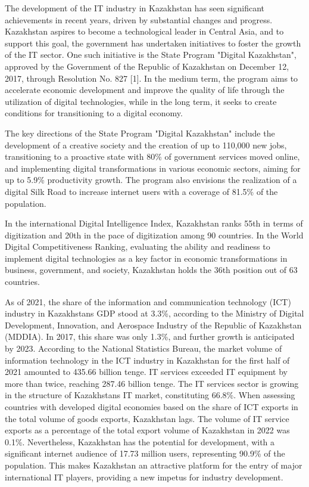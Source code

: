 The development of the IT industry in Kazakhstan has seen significant
achievements in recent years, driven by substantial changes and
progress. Kazakhstan aspires to become a technological leader in Central
Asia, and to support this goal, the government has undertaken
initiatives to foster the growth of the IT sector. One such initiative
is the State Program "Digital Kazakhstan", approved by the Government of
the Republic of Kazakhstan on December 12, 2017, through Resolution No.
827 {[}1{]}. In the medium term, the program aims to accelerate economic
development and improve the quality of life through the utilization of
digital technologies, while in the long term, it seeks to create
conditions for transitioning to a digital economy.

The key directions of the State Program "Digital Kazakhstan" include the
development of a creative society and the creation of up to 110,000 new
jobs, transitioning to a proactive state with 80\% of government
services moved online, and implementing digital transformations in
various economic sectors, aiming for up to 5.9\% productivity growth.
The program also envisions the realization of a digital Silk Road to
increase internet users with a coverage of 81.5\% of the population.

In the international Digital Intelligence Index, Kazakhstan ranks 55th
in terms of digitization and 20th in the pace of digitization among 90
countries. In the World Digital Competitiveness Ranking, evaluating the
ability and readiness to implement digital technologies as a key factor
in economic transformations in business, government, and society,
Kazakhstan holds the 36th position out of 63 countries.

As of 2021, the share of the information and communication technology
(ICT) industry in Kazakhstan\textquotesingle s GDP stood at 3.3\%,
according to the Ministry of Digital Development, Innovation, and
Aerospace Industry of the Republic of Kazakhstan (MDDIA). In 2017, this
share was only 1.3\%, and further growth is anticipated by 2023.
According to the National Statistics Bureau, the market volume of
information technology in the ICT industry in Kazakhstan for the first
half of 2021 amounted to 435.66 billion tenge. IT services exceeded IT
equipment by more than twice, reaching 287.46 billion tenge. The IT
services sector is growing in the structure of
Kazakhstan\textquotesingle s IT market, constituting 66.8\%. When
assessing countries with developed digital economies based on the share
of ICT exports in the total volume of goods exports, Kazakhstan lags.
The volume of IT service exports as a percentage of the total export
volume of Kazakhstan in 2022 was 0.1\%. Nevertheless, Kazakhstan has the
potential for development, with a significant internet audience of 17.73
million users, representing 90.9\% of the population. This makes
Kazakhstan an attractive platform for the entry of major international
IT players, providing a new impetus for industry development.

